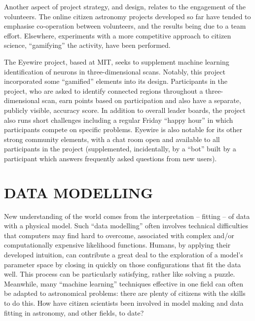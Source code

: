 \documentclass{ar2e}
\begin{document}


Another aspect of project strategy, and design, relates to the engagement of the
volunteers. The online citizen astronomy projects developed so far have tended
to emphasise co-operation between volunteers, and the results being due to a
team effort. Elsewhere, experiments with a more competitive approach to citizen
science, ``gamifying'' the activity, have been performed.

The Eyewire project, based at MIT, seeks to supplement machine learning
identification of neurons in three-dimensional scans. Notably, this project
incorporated some ``gamified'' elements into its design. Participants in the
project, who are asked to identify connected regions throughout a
three-dimensional scan, earn points based on participation and also have a
separate, publicly visible, accuracy score.  In addition to overall leader
boards, the project also runs short challenges including a regular Friday
``happy hour'' in which participants compete on specific problems. Eyewire is
also notable for its other strong community elements, with a chat room open and
available to all participants in the project (supplemented, incidentally, by a
``bot'' built by a participant which answers frequently asked questions from new
users). 




\section{DATA MODELLING}
\label{sec:model}

New understanding of the world comes from the interpretation -- fitting -- of
data with a physical model. Such ``data modelling'' often involves technical
difficulties that computers may find hard to overcome, associated with complex
and/or computationally expensive likelihood functions. Humans, by applying their
developed intuition, can contribute a great deal to the exploration of a model's
parameter space by closing in quickly on those configurations that fit the data
well. This process can be particularly satisfying, rather like solving a puzzle.
Meanwhile, many ``machine learning'' techniques effective in one field can often
be adapted to astronomical problems: there are plenty of citizens with the
skills to do this. How have citizen scientists been involved in model making and
data fitting in astronomy, and other fields, to date?
\end{document}
